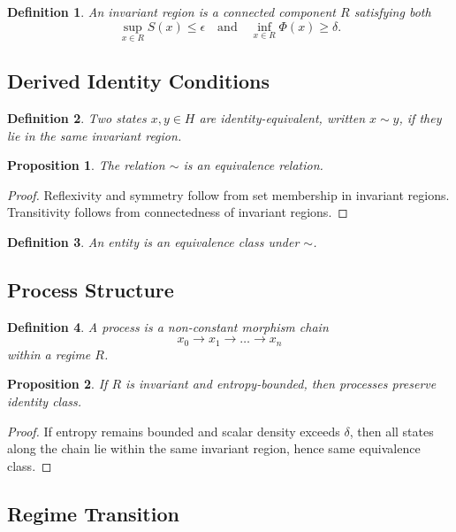 \documentclass[12pt]{article}
\newtheorem{proposition}{Proposition}
\newtheorem{definition}{Definition}
\begin{document}
\begin{definition}
An invariant region is a connected component $R$ satisfying both
\[
\sup_{x \in R} S(x) \le \epsilon
\quad \text{and} \quad
\inf_{x \in R} \Phi(x) \ge \delta.
\]
\end{definition}

\subsection{Derived Identity Conditions}

\begin{definition}
Two states $x,y \in H$ are identity-equivalent, written $x \sim y$, if they lie in the same invariant region.
\end{definition}

\begin{proposition}
The relation $\sim$ is an equivalence relation.
\end{proposition}

\begin{proof}
Reflexivity and symmetry follow from set membership in invariant regions. Transitivity follows from connectedness of invariant regions.
\end{proof}

\begin{definition}
An entity is an equivalence class under $\sim$.
\end{definition}

\subsection{Process Structure}

\begin{definition}
A process is a non-constant morphism chain
\[
x_0 \to x_1 \to \dots \to x_n
\]
within a regime $R$.
\end{definition}

\begin{proposition}
If $R$ is invariant and entropy-bounded, then processes preserve identity class.
\end{proposition}

\begin{proof}
If entropy remains bounded and scalar density exceeds $\delta$, then all states along the chain lie within the same invariant region, hence same equivalence class.
\end{proof}

\subsection{Regime Transition}
\end{document}
